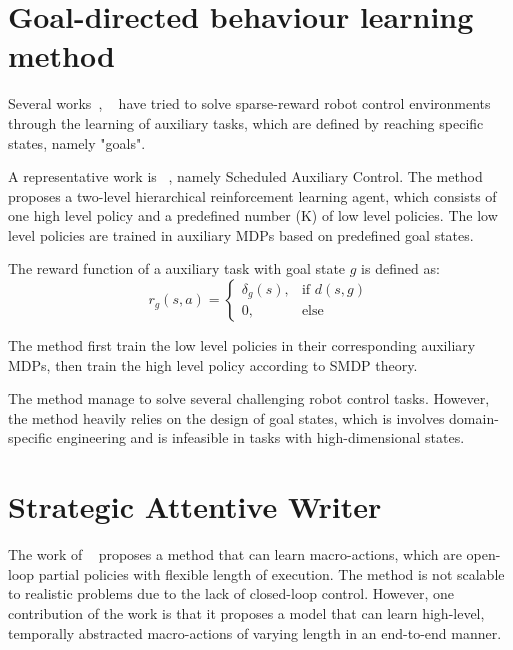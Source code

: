 \section{Goal-directed behaviour learning method}
Several works~\cite{riedmiller2018learning}, ~\cite{andrychowicz2017hindsight} have tried to solve sparse-reward robot control environments through the learning of auxiliary tasks, which are defined by reaching specific states, namely "goals".

A representative work is ~\cite{riedmiller2018learning}, namely Scheduled Auxiliary Control. The method proposes a two-level hierarchical reinforcement learning agent, which consists of one high level policy and a predefined number (K) of low level policies. The low level policies are trained in auxiliary MDPs based on predefined goal states.

The reward function of a auxiliary task with goal state $g$ is defined as:
\begin{equation}
 r_g(s,a)= 
    \begin{cases}
    \delta_g(s),& \text{if } d(s,g)\\
    0,              & \text{else}
\end{cases}
\end{equation}

The method first train the low level policies in their corresponding auxiliary MDPs, then train the high level policy according to SMDP theory.

The method manage to solve several challenging robot control tasks. However, the method heavily relies on the design of goal states, which is involves domain-specific engineering and is infeasible in tasks with high-dimensional states.


\section{Strategic Attentive Writer}
The work of ~\cite{vezhnevets2016strategic} proposes a method that can learn macro-actions, which are open-loop partial policies with flexible length of execution. The method is not scalable to realistic problems due to the lack of closed-loop control. However, one contribution of the work is that it proposes a model that can learn high-level, temporally abstracted macro-actions of varying length in an end-to-end manner.